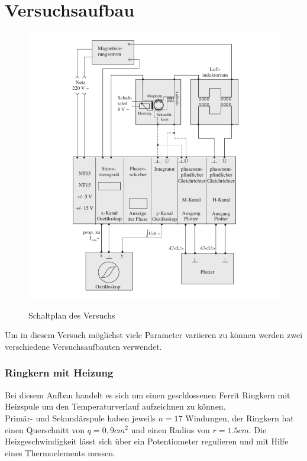 \section{Versuchsaufbau}
    \begin{figure}[ht]
        \centering
        \includegraphics[width=\textwidth]{Images/Schaltplan.PNG}
        \label{Schaltplan}
        \caption{Schaltplan des Versuchs}
    \end{figure}
    Um in diesem Versuch möglichst viele Parameter variieren zu können werden zwei verschiedene Versuchsaufbauten verwendet.

    \subsubsection*{Ringkern mit Heizung}
        Bei diesem Aufbau handelt es sich um einen geschlossenen Ferrit Ringkern mit Heizspule um den Temperaturverlauf aufzeichnen zu können.\\
        Primär- und Sekundärspule haben jeweils $n=17$ Windungen, der Ringkern hat einen Querschnitt von $q=0,9cm^2$ und einen Radius von $r=1.5cm$.
        Die Heizgeschwindigkeit lässt sich über ein Potentiometer regulieren und mit Hilfe eines Thermoelements messen.
    
